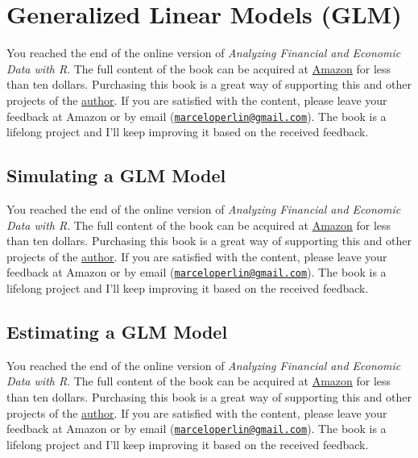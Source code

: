 \documentclass[
  12pt,
]{book}
\newenvironment{pleasebuyit}
{\begin{noteblock}
		
	} {\end{noteblock}}
\begin{document}
\hypertarget{generalized-linear-models-glm}{%
\section{Generalized Linear Models (GLM)}\label{generalized-linear-models-glm}}

\begin{pleasebuyit}
You reached the end of the online version of \emph{Analyzing Financial
and Economic Data with R}. The full content of the book can be acquired
at \href{https://www.amazon.com/dp/B084LSNXMN}{Amazon} for less than ten
dollars. Purchasing this book is a great way of supporting this and
other projects of the \href{https://www.msperlin.com/blog/}{author}. If
you are satisfied with the content, please leave your feedback at Amazon
or by email
(\href{mailto:marceloperlin@gmail.com}{\nolinkurl{marceloperlin@gmail.com}}).
The book is a lifelong project and I'll keep improving it based on the
received feedback.
\end{pleasebuyit}

\hypertarget{simulating-a-glm-model}{%
\subsection{Simulating a GLM Model}\label{simulating-a-glm-model}}

\begin{pleasebuyit}
You reached the end of the online version of \emph{Analyzing Financial
and Economic Data with R}. The full content of the book can be acquired
at \href{https://www.amazon.com/dp/B084LSNXMN}{Amazon} for less than ten
dollars. Purchasing this book is a great way of supporting this and
other projects of the \href{https://www.msperlin.com/blog/}{author}. If
you are satisfied with the content, please leave your feedback at Amazon
or by email
(\href{mailto:marceloperlin@gmail.com}{\nolinkurl{marceloperlin@gmail.com}}).
The book is a lifelong project and I'll keep improving it based on the
received feedback.
\end{pleasebuyit}

\hypertarget{estimating-a-glm-model}{%
\subsection{Estimating a GLM Model}\label{estimating-a-glm-model}}

\begin{pleasebuyit}
You reached the end of the online version of \emph{Analyzing Financial
and Economic Data with R}. The full content of the book can be acquired
at \href{https://www.amazon.com/dp/B084LSNXMN}{Amazon} for less than ten
dollars. Purchasing this book is a great way of supporting this and
other projects of the \href{https://www.msperlin.com/blog/}{author}. If
you are satisfied with the content, please leave your feedback at Amazon
or by email
(\href{mailto:marceloperlin@gmail.com}{\nolinkurl{marceloperlin@gmail.com}}).
The book is a lifelong project and I'll keep improving it based on the
received feedback.
\end{pleasebuyit}
\end{document}
